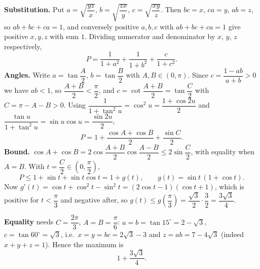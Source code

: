 \textbf{Substitution.} Put $a=\sqrt{\dfrac{yz}{x}}$, $b=\sqrt{\dfrac{zx}{y}}$, $c=\sqrt{\dfrac{xy}{z}}$. Then $bc=x$, $ca=y$, $ab=z$, so $ab+bc+ca=1$, and conversely positive $a,b,c$ with $ab+bc+ca=1$ give positive $x,y,z$ with sum $1$. Dividing numerator and denominator by $x$, $y$, $z$ respectively,
\[
P=\dfrac{1}{1+a^2}+\dfrac{1}{1+b^2}+\dfrac{c}{1+c^2}.
\]
\textbf{Angles.} Write $a=\tan\dfrac {A}{2}$, $b=\tan\dfrac {B}{2}$ with $A,B\in(0,\pi)$. Since $c=\dfrac{1-ab}{a+b}>0$ we have $ab<1$, so $\dfrac{A+B}{2}<\dfrac{\pi}{2}$, and $c=\cot\dfrac{A+B}{2}=\tan\dfrac {C}{2}$ with $C=\pi-A-B>0$. Using $\dfrac{1}{1+\tan^2u}=\cos^2u=\dfrac{1+\cos2u}{2}$ and $\dfrac{\tan u}{1+\tan^2u}=\sin u\cos u=\dfrac{\sin 2u}{2}$,
\[
P=1+\dfrac{\cos A+\cos B}{2}+\dfrac{\sin C}{2}.
\]
\textbf{Bound.} $\cos A+\cos B=2\cos\dfrac{A+B}{2}\cos\dfrac{A-B}{2}\le2\sin\dfrac {C}{2}$, with equality when $A=B$. With $t=\dfrac {C}{2}\in\left(0,\dfrac{\pi}{2}\right)$,
\[
P\le1+\sin t+\sin t\cos t=1+g(t),\qquad g(t)=\sin t\,(1+\cos t).
\]
Now $g'(t)=\cos t+\cos^2t-\sin^2t=(2\cos t-1)(\cos t+1)$, which is positive for $t<\dfrac{\pi}{3}$ and negative after, so $g(t)\le g\left(\dfrac{\pi}{3}\right)=\dfrac{\sqrt3}{2}\cdot\dfrac{3}{2}=\dfrac{3\sqrt3}{4}$.

\textbf{Equality} needs $C=\dfrac{2\pi}{3}$, $A=B=\dfrac{\pi}{6}$: $a=b=\tan15^\circ=2-\sqrt3$, $c=\tan60^\circ=\sqrt3$, i.e.\ $x=y=bc=2\sqrt3-3$ and $z=ab=7-4\sqrt3$ (indeed $x+y+z=1$). Hence the maximum is
\[
\boxed{1+\dfrac{3\sqrt3}{4}}.
\]
